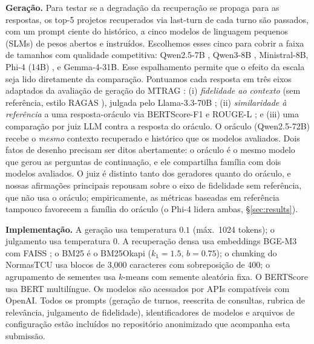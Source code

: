 \documentclass[conference]{IEEEtran}
\begin{document}
\textbf{Geração.} Para testar se a degradação da recuperação se propaga para as
respostas, os top-5 projetos recuperados via last-turn de cada turno são
passados, com um prompt ciente do histórico, a cinco modelos de linguagem
pequenos (SLMs) de pesos abertos e instruídos. Escolhemos esses cinco para
cobrir a faixa de tamanhos com qualidade competitiva: Qwen2.5-7B
\cite{Qwen2024Qwen25}, Qwen3-8B \cite{Yang2025Qwen3}, Ministral-8B, Phi-4 (14B)
\cite{Abdin2024Phi4}, e Gemma-4-31B. Esse espalhamento permite que o efeito da
escala seja lido diretamente da comparação. Pontuamos cada resposta em três
eixos adaptados da avaliação de geração do MTRAG \cite{Katsis2025MTRAG}:
(i) \emph{fidelidade ao contexto} (sem referência, estilo RAGAS
\cite{Es2024RAGAS}), julgada pelo Llama-3.3-70B \cite{Grattafiori2024Llama3};
(ii) \emph{similaridade à referência} a uma resposta-oráculo via BERTScore-F1
\cite{Zhang2020BERTScore} e ROUGE-L \cite{Lin2004ROUGE}; e (iii) uma comparação
por juiz LLM contra a resposta do oráculo. O oráculo (Qwen2.5-72B) recebe o
\emph{mesmo} contexto recuperado e histórico que os modelos avaliados. Dois
fatos de desenho precisam ser ditos abertamente: o oráculo é o mesmo modelo que
gerou as perguntas de continuação, e ele compartilha família com dois modelos
avaliados. O juiz é distinto tanto dos geradores quanto do oráculo, e nossas
afirmações principais repousam sobre o eixo de fidelidade sem referência, que
não usa o oráculo; empiricamente, as métricas baseadas em referência tampouco
favorecem a família do oráculo (o Phi-4 lidera ambas, \S\ref{sec:results}).

\textbf{Implementação.} A geração usa temperatura $0.1$ (máx.\ 1024 tokens); o
julgamento usa temperatura $0$. A recuperação densa usa embeddings BGE-M3 com
FAISS \cite{Douze2024Faiss}; o BM25 é o BM25Okapi ($k_1{=}1.5$, $b{=}0.75$); o
chunking do NormasTCU usa blocos de 3{,}000 caracteres com sobreposição de 400;
o agrupamento de sementes usa $k$-means com semente aleatória fixa. O BERTScore
usa BERT multilíngue. Os modelos são acessados por APIs compatíveis com OpenAI.
Todos os prompts (geração de turnos, reescrita de consultas, rubrica de
relevância, julgamento de fidelidade), identificadores de modelos e arquivos de
configuração estão incluídos no repositório anonimizado que acompanha esta
submissão.

\end{document}
